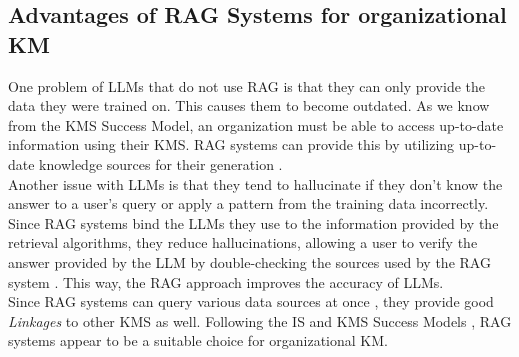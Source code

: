 \documentclass[
	english,
	ruledheaders=section,%
	class=report,%
	thesis={type=bachelor},%
	accentcolor=1b,%
	custommargins=true,%
	marginpar=false,%
	parskip=half-,%
	fontsize=11pt,%
	DIV=14,
]{tudapub}
\begin{document}
\subsection{Advantages of RAG Systems for organizational KM}
One problem of LLMs that do not use RAG is that they can only provide the data they were trained on. This causes them to become outdated. As we know from the KMS Success Model, an organization must be able to access up-to-date information using their KMS. RAG systems can provide this by utilizing up-to-date knowledge sources for their generation \parencite[p.~9459]{Lewis2020}.\\
Another issue with LLMs is that they tend to hallucinate if they don't know the answer to a user's query or apply a pattern from the training data incorrectly. Since RAG systems bind the LLMs they use to the information provided by the retrieval algorithms, they reduce hallucinations, allowing a user to verify the answer provided by the LLM by double-checking the sources used by the RAG system \parencite[p.~9469]{Lewis2020}. This way, the RAG approach improves the accuracy of LLMs.\\
Since RAG systems can query various data sources at once \parencite{GoogleCloudRAG}, they provide good \textit{Linkages} to other KMS as well. Following the IS \parencite{DeloneMcLean2003ISSuccessTenYearUpdate} and KMS Success Models \parencite{Jennex2006}, RAG systems appear to be a suitable choice for organizational KM.
\end{document}

